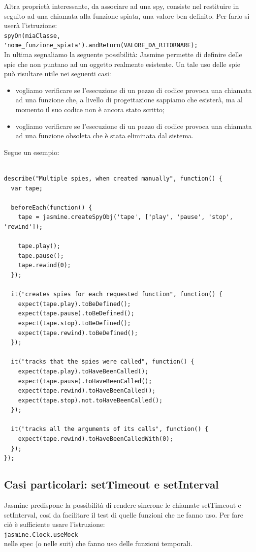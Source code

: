 \documentclass[10pt,a4paper,onecolumn]{article}
\begin{document}
Altra proprietà interessante, da associare ad una spy, consiste nel restituire in seguito ad una chiamata alla funzione spiata, una valore ben definito. Per farlo si userà l'istruzione:\\

\verb|spyOn(miaClasse, 'nome_funzione_spiata').andReturn(VALORE_DA_RITORNARE);|\\

In ultima segnaliamo la seguente possibilità: Jasmine permette di definire delle spie che non puntano ad un oggetto realmente esistente. Un tale uso delle spie può risultare utile nei seguenti casi:

\begin{itemize}
		\item vogliamo verificare se l'esecuzione di un pezzo di codice provoca una chiamata ad una funzione che, a livello di progettazione sappiamo che esisterà, ma al momento il suo codice non è ancora stato scritto;
		\item vogliamo verificare se l'esecuzione di un pezzo di codice provoca una chiamata ad una funzione obsoleta che è stata eliminata dal sistema.
\end{itemize}

Segue un esempio:

\begin{lstlisting}

describe("Multiple spies, when created manually", function() {
  var tape;

  beforeEach(function() {
    tape = jasmine.createSpyObj('tape', ['play', 'pause', 'stop', 'rewind']);

    tape.play();
    tape.pause();
    tape.rewind(0);
  });

  it("creates spies for each requested function", function() {
    expect(tape.play).toBeDefined();
    expect(tape.pause).toBeDefined();
    expect(tape.stop).toBeDefined();
    expect(tape.rewind).toBeDefined();
  });

  it("tracks that the spies were called", function() {
    expect(tape.play).toHaveBeenCalled();
    expect(tape.pause).toHaveBeenCalled();
    expect(tape.rewind).toHaveBeenCalled();
    expect(tape.stop).not.toHaveBeenCalled();
  });

  it("tracks all the arguments of its calls", function() {
    expect(tape.rewind).toHaveBeenCalledWith(0);
  });
});

\end{lstlisting}

\subsection{Casi particolari: setTimeout e setInterval}

Jasmine predispone la possibilità di rendere sincrone le chiamate setTimeout e setInterval, cosi da facilitare il test di quelle funzioni che ne fanno uso. Per fare ciò è sufficiente usare l'istruzione:\\

\verb|jasmine.Clock.useMock|\\

nelle spec (o nelle suit) che fanno uso delle funzioni temporali.
\end{document}
